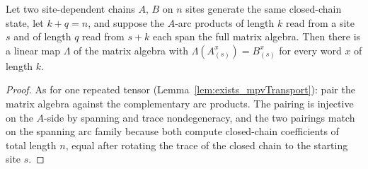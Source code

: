 \begin{lemma}%
    \label{lem:exists_arcTransport}
    \leanok
    Let two site-dependent chains $A$, $B$ on $n$ sites generate the same
    closed-chain state, let $k + q = n$, and suppose the $A$-arc products
    of length $k$ read from a site $s$ and of length $q$ read from
    $s + k$ each span the full matrix algebra.  Then there is a linear
    map $\Lambda$ of the matrix algebra with
    $\Lambda(A_{(s)}^{x}) = B_{(s)}^{x}$ for every word $x$ of length
    $k$.
\end{lemma}
\begin{proof}\leanok
    As for one repeated tensor (Lemma~\ref{lem:exists_mpvTransport}):
    pair the matrix algebra against the complementary arc products.  The
    pairing is injective on the $A$-side by spanning and trace
    nondegeneracy, and the two pairings match on the spanning arc family
    because both compute closed-chain coefficients of total length $n$,
    equal after rotating the trace of the closed chain to the starting
    site $s$.
\end{proof}

